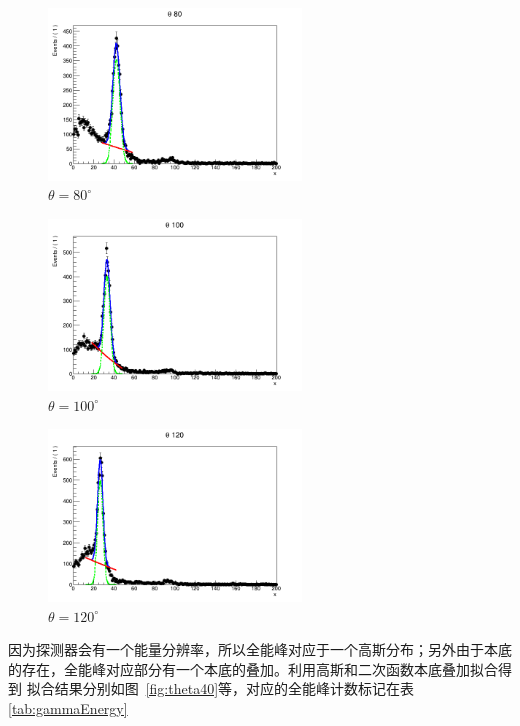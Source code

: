 \documentclass[10pt]{ctexart}
\begin{document}
\begin{figure}
    \centering
    \includegraphics[width=0.6\textwidth]{data/80.png}
    \caption{$\theta=80^\circ$}
    \label{fig:theta80}
\end{figure}
\begin{figure}
    \centering
    \includegraphics[width=0.6\textwidth]{data/100.png}
    \caption{$\theta=100^\circ$}
    \label{fig:theta100}
\end{figure}
\begin{figure}
    \centering
    \includegraphics[width=0.6\textwidth]{data/120.png}
    \caption{$\theta=120^\circ$}
    \label{fig:theta120}
\end{figure}
因为探测器会有一个能量分辨率，所以全能峰对应于一个高斯分布；另外由于本底的存在，全能峰对应部分有一个本底的叠加。利用高斯和二次函数本底\cite{}叠加拟合得到
拟合结果分别如图~\ref{fig:theta40}等，对应的全能峰计数标记在表\ref{tab:gammaEnergy}
\end{document}
